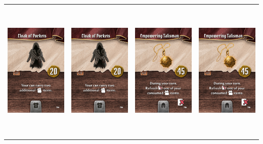 \documentclass{minimal}
\begin{document}
{\begin{longtable}{llll}
\includegraphics[width=44mm,height=68mm]{./15-21/gh-016-cloak-of-pockets.png} &
\includegraphics[width=44mm,height=68mm]{./15-21/gh-016-cloak-of-pockets.png} &
\includegraphics[width=44mm,height=68mm]{./15-21/gh-017-empowering-talisman.png} &
\includegraphics[width=44mm,height=68mm]{./15-21/gh-017-empowering-talisman.png}\\ 

\end{longtable}}
\end{document}

